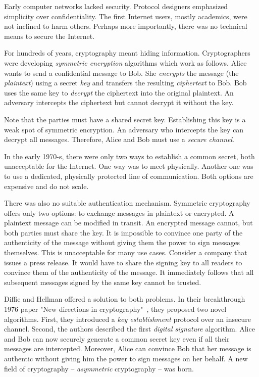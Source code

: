 Early computer networks lacked security.
Protocol designers emphasized simplicity over confidentiality.
The first Internet users, mostly academics, were not inclined to harm others.
Perhaps more importantly, there was no technical means to secure the Internet.

For hundreds of years, cryptography meant hiding information.
Cryptographers were developing \textit{symmetric encryption} algorithms which work as follows.
Alice wants to send a confidential message to Bob.
She \textit{encrypts} the message (the \textit{plaintext}) using a secret \textit{key} and transfers the resulting \textit{ciphertext} to Bob.
Bob uses the same key to \textit{decrypt} the ciphertext into the original plaintext.
An adversary intercepts the ciphertext but cannot decrypt it without the key.

Note that the parties must have a shared secret key.
Establishing this key is a weak spot of symmetric encryption.
An adversary who intercepts the key can decrypt all messages.
Therefore, Alice and Bob must use a \textit{secure channel}.

In the early 1970-s, there were only two ways to establish a common secret, both unacceptable for the Internet.
One way was to meet physically.
Another one was to use a dedicated, physically protected line of communication.
Both options are expensive and do not scale.

There was also no suitable authentication mechanism.
Symmetric cryptography offers only two options: to exchange messages in plaintext or encrypted.
A plaintext message can be modified in transit.
An encrypted message cannot, but both parties must share the key.
It is impossible to convince one party of the authenticity of the message without giving them the power to sign messages themselves.
This is unacceptable for many use cases.
Consider a company that issues a press release.
It would have to share the signing key to all readers to convince them of the authenticity of the message.
It immediately follows that all subsequent messages signed by the same key cannot be trusted.

Diffie and Hellman offered a solution to both problems.
In their breakthrough 1976 paper "New directions in cryptography"~\cite{Diffie1976}, they proposed two novel algorithms.
First, they introduced a \textit{key establishment} protocol over an insecure channel.
Second, the authors described the first \textit{digital signature} algorithm.
Alice and Bob can now securely generate a common secret key even if all their messages are intercepted.
Moreover, Alice can convince Bob that her message is authentic without giving him the power to sign messages on her behalf.
A new field of cryptography -- \textit{asymmetric} cryptography -- was born.

